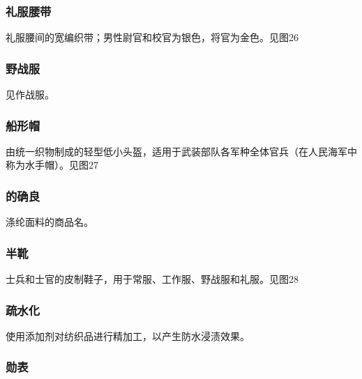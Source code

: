 \subsubsection*{礼服腰带}%

礼服腰间的宽编织带；男性尉官和校官为银色，将官为金色。见图26

\subsubsection*{野战服}%

见作战服。

\subsubsection*{船形帽}%

由统一织物制成的轻型低小头盔，适用于武装部队各军种全体官兵（在人民海军中称为水手帽）。见图27

\subsubsection*{的确良}%

涤纶面料的商品名。

\subsubsection*{半靴}%

士兵和士官的皮制鞋子，用于常服、工作服、野战服和礼服。见图28

\subsubsection*{疏水化}%

使用添加剂对纺织品进行精加工，以产生防水浸渍效果。

\subsubsection*{勋表}%

